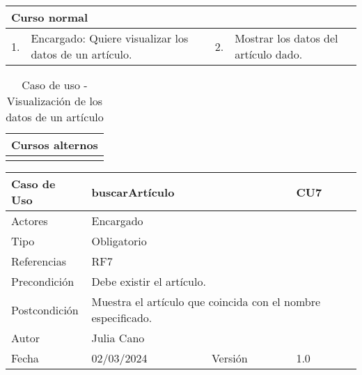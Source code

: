\begin{table}[H]
	\centering
	\begin{tabular}{| m{} | m{} | m{} | m{} |}
		\hline
		\multicolumn{4}{|m{0.9\textwidth}|}{Curso normal}     \\ 
		\hline
		1. & Encargado: Quiere visualizar los datos de un artículo. & 2. &  Mostrar los datos del artículo dado.  \\ 
		\hline
	\end{tabular}
\end{table}

\begin{table}[H]
	\centering
	\begin{tabular}{| m{} | m{} | m{} | m{} |}
		\hline
		\multicolumn{4}{|m{0.9\textwidth}|}{Cursos alternos}     \\ 
		\hline
		& \multicolumn{3}{m{0.67\textwidth}|}{} \\ 
		\hline
	\end{tabular}
	\caption{Caso de uso - Visualización de los datos de un artículo}
\end{table}

\newpage


\begin{table}[H]
	\centering
	\begin{tabular}{| m{} | m{} | m{} | m{}|}
		\hline
		\rowcolor{grayshade} Caso de Uso & \multicolumn{2}{|m{0.43\textwidth}|}{buscarArtículo} &  CU7\\ 
		\hline
		Actores & \multicolumn{3}{l|}{Encargado} \\ 
		\hline
		Tipo & \multicolumn{3}{l|}{Obligatorio} \\ 
		\hline
		Referencias & \multicolumn{3}{l|}{RF7} \\ 
		\hline
		Precondición & \multicolumn{3}{m{0.67\textwidth}|}{Debe existir el artículo.} \\ 
		\hline
		Postcondición & \multicolumn{3}{m{0.67\textwidth}|}{Muestra el artículo que coincida con el nombre especificado.} \\ 
		\hline
		Autor & \multicolumn{3}{l|}{Julia Cano} \\ 
		\hline
		Fecha & 02/03/2024 & Versión & 1.0 \\
		\hline
	\end{tabular}
\end{table}


